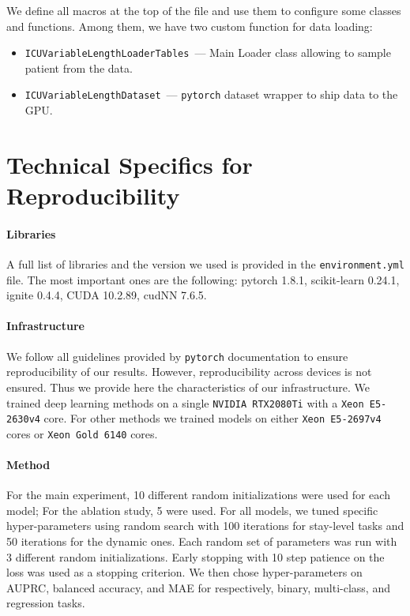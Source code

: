 \documentclass{article}
\begin{document}
We define all macros at the top of the file and use them to configure some classes and functions. Among them, we have two custom function for data loading:
\begin{itemize}
    \item \texttt{ICUVariableLengthLoaderTables}~--- Main Loader class allowing to sample patient from the data. \\
    \item \texttt{ICUVariableLengthDataset}~--- \texttt{pytorch} dataset wrapper to ship data to the GPU.
\end{itemize}



\section*{Technical Specifics for Reproducibility}\label{appsec:detail-training} 
\paragraph{Libraries} A full list of libraries and the version we used is provided in the \texttt{environment.yml} file. The most important ones are the following: pytorch 1.8.1, scikit-learn 0.24.1, ignite 0.4.4, CUDA 10.2.89, cudNN 7.6.5.

\paragraph{Infrastructure}
We follow all guidelines provided by \texttt{pytorch} documentation to ensure reproducibility of our results. However, reproducibility across devices is not ensured. Thus we provide here the characteristics of our infrastructure. We trained deep learning methods on a single \texttt{NVIDIA RTX2080Ti} with a \texttt{Xeon E5-2630v4} core. For other methods we trained models on either \texttt{Xeon E5-2697v4} cores or \texttt{Xeon Gold 6140} cores. 


\paragraph{Method}
For the main experiment, 10 different random initializations were used for each model; For the ablation study, 5 were used. For all models, we tuned specific hyper-parameters using random search with 100 iterations for stay-level tasks and 50 iterations for the dynamic ones. Each random set of parameters was run with 3 different random initializations. Early stopping with 10 step patience on the loss was used as a stopping criterion. We then chose hyper-parameters on AUPRC, balanced accuracy, and MAE for respectively, binary, multi-class, and regression tasks.
\end{document}
